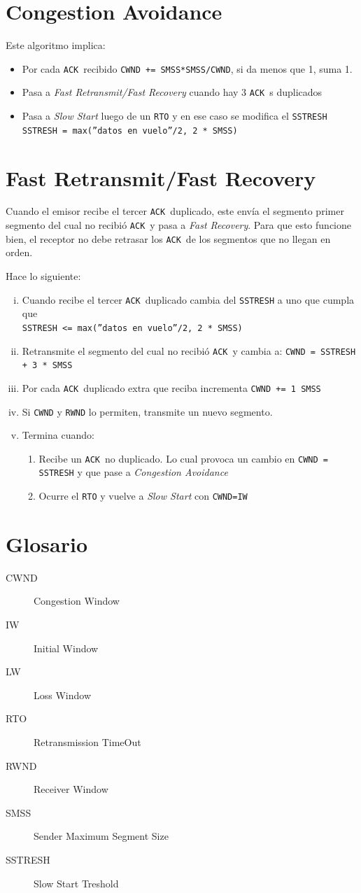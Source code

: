 \documentclass[a4paper,10pt]{article}
\def\ack{\texttt{ACK}\ }
\newcommand\cmd[1]{\texttt{#1}}
\begin{document}
\section*{Congestion Avoidance}
Este algoritmo implica:
\begin{itemize}
	\item Por cada \ack recibido \cmd{CWND += SMSS*SMSS/CWND}, si da menos que
		1, suma 1.
	\item Pasa a \emph{Fast Retransmit/Fast Recovery} cuando hay 3 \ack s duplicados
	\item Pasa a \emph{Slow Start} luego de un \cmd{RTO} y en ese caso se
		modifica el \cmd{SSTRESH}\\ 
		\cmd{SSTRESH = max(''datos en vuelo''/2, 2 * SMSS)}
\end{itemize}

\section*{Fast Retransmit/Fast Recovery}
Cuando el emisor recibe el tercer \ack duplicado, este envía el segmento primer
segmento del cual no recibió \ack y pasa a \emph{Fast Recovery}. Para que esto
funcione bien, el receptor no debe retrasar los \ack de los segmentos que no
llegan en orden.

Hace lo siguiente:

\begin{enumerate}[i.]
	\item 	Cuando recibe el tercer \ack duplicado cambia del \cmd{SSTRESH} a uno
		que cumpla que \\ \cmd{SSTRESH <= max(''datos en vuelo''/2, 2 * SMSS)}
	\item	Retransmite el segmento del cual no recibió \ack y cambia a:
		\cmd{CWND = SSTRESH + 3 * SMSS}
	\item 	Por cada \ack duplicado extra que reciba incrementa \cmd{CWND += 1
		SMSS}
	\item Si \cmd{CWND} y \cmd{RWND} lo permiten, transmite un nuevo segmento.
	\item Termina cuando:
		\begin{enumerate}
			\item Recibe un \ack no duplicado. Lo cual provoca un cambio en
				\cmd{CWND = SSTRESH} y que pase a \emph{Congestion Avoidance}
			\item Ocurre el \cmd{RTO} y vuelve a \emph{Slow Start} con
				\cmd{CWND=IW}
		\end{enumerate}
\end{enumerate}

\section*{Glosario}
\begin{description}
	\item[CWND] Congestion Window
	\item[IW]	Initial Window
	\item[LW]	Loss Window
	\item[RTO]	Retransmission TimeOut
	\item[RWND] Receiver Window
	\item[SMSS]	Sender Maximum Segment Size
	\item[SSTRESH] Slow Start Treshold

\end{description}
\end{document}
